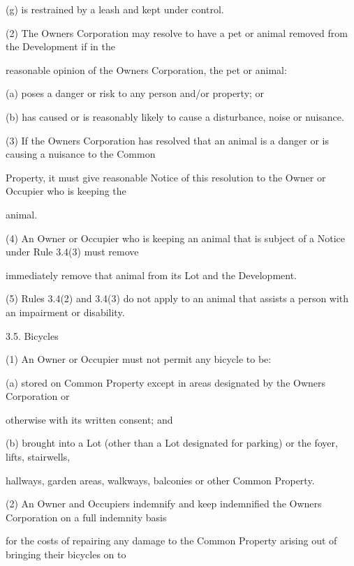 \documentclass{article}
\begin{document}
{\fontsize{9.962}{1}(g) is restrained by a leash and kept under control. }

{\fontsize{9.962}{1}(2) The Owners Corporation may resolve to have a pet or animal removed from the Development if in the }

{\fontsize{10.02}{1}reasonable opinion of the Owners Corporation, the pet or animal: }

\newpage

{\fontsize{9.962}{1}(a) poses a danger or risk to any person and/or property; or }

{\fontsize{9.962}{1}(b) has caused or is reasonably likely to cause a disturbance, noise or nuisance. }

{\fontsize{9.962}{1}(3) If the Owners Corporation has resolved that an animal is a danger or is causing a nuisance to the Common }

{\fontsize{10.02}{1}Property, it must give reasonable Notice of this resolution to the Owner or Occupier who is keeping the }

{\fontsize{10.02}{1}animal. }

{\fontsize{9.962}{1}(4) An Owner or Occupier who is keeping an animal that is subject of a Notice under Rule 3.4(3) must remove }

{\fontsize{10.02}{1}immediately remove that animal from its Lot and the Development. }

{\fontsize{9.962}{1}(5) Rules 3.4(2) and 3.4(3) do not apply to an animal that assists a person with an impairment or disability. }

{\fontsize{9.99}{1}3.5. Bicycles }

{\fontsize{9.962}{1}(1) An Owner or Occupier must not permit any bicycle to be: }

{\fontsize{9.962}{1}(a) stored on Common Property except in areas designated by the Owners Corporation or }

{\fontsize{10.02}{1}otherwise with its written consent; and }

{\fontsize{9.962}{1}(b) brought into a Lot (other than a Lot designated for parking) or the foyer, lifts, stairwells, }

{\fontsize{10.02}{1}hallways, garden areas, walkways, balconies or other Common Property. }

{\fontsize{9.962}{1}(2) An Owner and Occupiers indemnify and keep indemnified the Owners Corporation on a full indemnity basis }

{\fontsize{10.02}{1}for the costs of repairing any damage to the Common Property arising out of bringing their bicycles on to }
\end{document}
